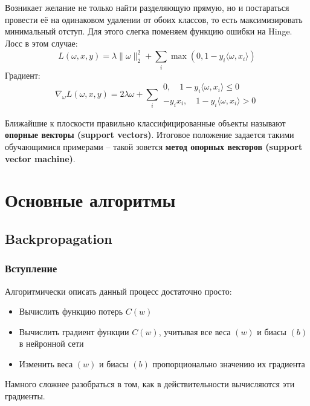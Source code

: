 \documentclass[a4paper, 10pt, openany]{book} %
\begin{document}
	Возникает желание не только найти разделяющую прямую, но и постараться провести её на одинаковом удалении от обоих классов, то есть максимизировать минимальный отступ. Для этого слегка поменяем функцию ошибки на Hinge. Лосс в этом случае:
	\begin{equation*}
		L(\omega, x, y) = \lambda \|\omega\|^2_2 + \sum_{i}^{} \max(0, 1 - y_i\langle \omega, x_i \rangle)
	\end{equation*}
	Градиент:
	\begin{equation*}
		\nabla_\omega L(\omega, x, y) = 2 \lambda \omega + \sum_{i}^{}
		\begin{gathered}
			0,\quad 1 - y_i\langle \omega, x_i \rangle \leq 0 \\
			- y_i x_i,\quad 1 - y_i\langle \omega, x_i \rangle > 0
		\end{gathered}
	\end{equation*}
	
	Ближайшие к плоскости правильно классифицированные объекты называют \textbf{опорные векторы (support vectors)}. Итоговое положение задается такими обучающимися примерами -- такой зовется \textbf{метод опорных векторов (support vector machine)}.
	
	\chapter{Основные алгоритмы}
	
	\section{Backpropagation}
	
	\subsection{Вступление}
	
	Алгоритмически описать данный процесс достаточно просто:
	
	\begin{itemize}
		\item Вычислить функцию потерь $C(w)$
		\item Вычислить градиент функции $C(w)$, учитывая все веса $(w)$ и биасы $(b)$ в нейронной сети
		\item Изменить веса $(w)$ и биасы $(b)$ пропорционально значению их градиента
	\end{itemize}
	
	Намного сложнее разобраться в том, как в действительности вычисляются эти градиенты.
	
\end{document}
